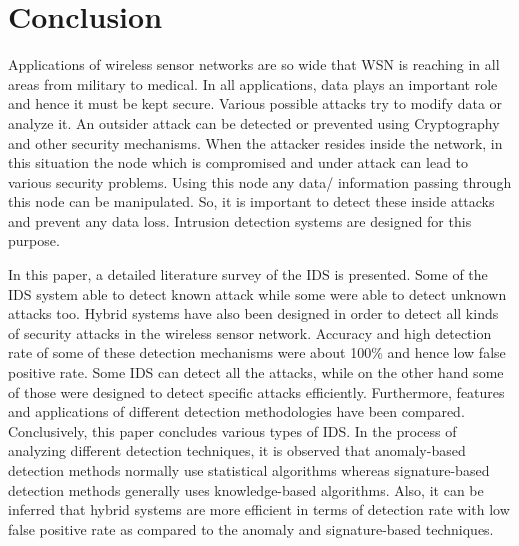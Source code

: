 \documentclass{svproc}
\begin{document}
\section{Conclusion}
Applications of wireless sensor networks are so wide that WSN is reaching in all areas from military to medical. In all applications, data plays an important role and hence it must be kept secure. Various possible attacks try to modify data or analyze it. An outsider attack can be detected or prevented using Cryptography and other security mechanisms. When the attacker resides inside the network, in this situation the node which is compromised and under attack can lead to various security problems. Using this node any data/ information passing through this node can be manipulated. So, it is important to detect these inside attacks and prevent any data loss. Intrusion detection systems are designed for this purpose.\par
In this paper, a detailed literature survey of the IDS is presented. Some of the IDS system able to detect known attack while some were able to detect unknown attacks too. Hybrid systems have also been designed in order to detect all kinds of security attacks in the wireless sensor network. Accuracy and high detection rate of some of these detection mechanisms were about 100\% and hence low false positive rate. Some IDS can detect all the attacks, while on the other hand some of those were designed to detect specific attacks efficiently. Furthermore, features and applications of different detection methodologies have been compared. Conclusively, this paper concludes various types of IDS. In the process of analyzing different detection techniques, it is observed that anomaly-based detection methods normally use statistical algorithms whereas signature-based detection methods generally uses knowledge-based algorithms. Also, it can be inferred that hybrid systems are more efficient in terms of detection rate with low false positive rate as compared to the anomaly and signature-based techniques.



\end{document}
